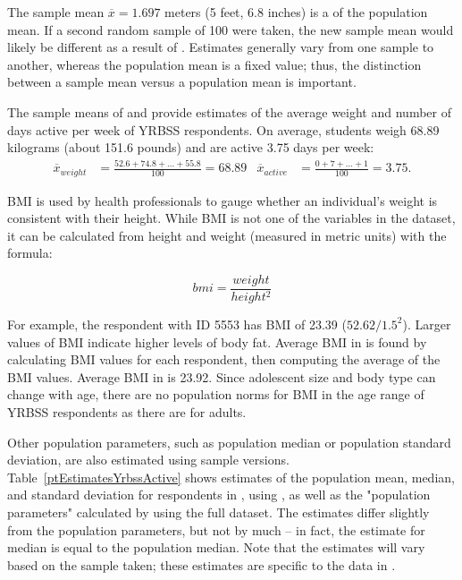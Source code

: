 \begin{spacing}{1.5}
The sample mean $\overline{x} = 1.697$ meters (5 feet, 6.8 inches) is a  of the population mean. If a second random sample of 100 were taken, the new sample mean would likely be different as a result of .  Estimates generally vary from one sample to another, whereas the population mean is a fixed value; thus, the distinction between a sample mean versus a population mean is important. 

The sample means of  and  provide estimates of the average weight and number of days active per week of YRBSS respondents. On average, students weigh 68.89 kilograms (about 151.6 pounds) and are active 3.75 days per week:
\begin{align*}
\overline{x}_{weight} &= \frac{52.6 + 74.8 + \dots + 55.8}{100} = 68.89
&\overline{x}_{active} &= \frac{0 + 7 + \dots + 1}{100} = 3.75.
\end{align*}

BMI is used by health professionals to gauge whether an individual's weight is consistent with their height. While BMI is not one of the variables in the dataset, it can be calculated from height and weight (measured in metric units) with the formula:

\[ bmi = \frac{weight}{height{^2}}\]

For example, the respondent with ID 5553 has BMI of 23.39 ($52.62/1.5^{2}$). Larger values of BMI indicate higher levels of body fat. Average BMI in  is found by calculating BMI values for each respondent, then computing the average of the BMI values. Average BMI in  is 23.92. Since adolescent size and body type can change with age, there are no population norms for BMI in the age range of YRBSS respondents as there are for adults.


Other population parameters, such as population median or population standard deviation, are also estimated using sample versions. Table~\ref{ptEstimatesYrbssActive} shows estimates of the population mean, median, and standard deviation for respondents in , using , as well as the "population parameters" calculated by using the full  dataset. The estimates differ slightly from the population parameters, but not by much -- in fact, the estimate for median is equal to the population median. Note that the estimates will vary based on the sample taken; these estimates are specific to the data in .


\end{spacing}
